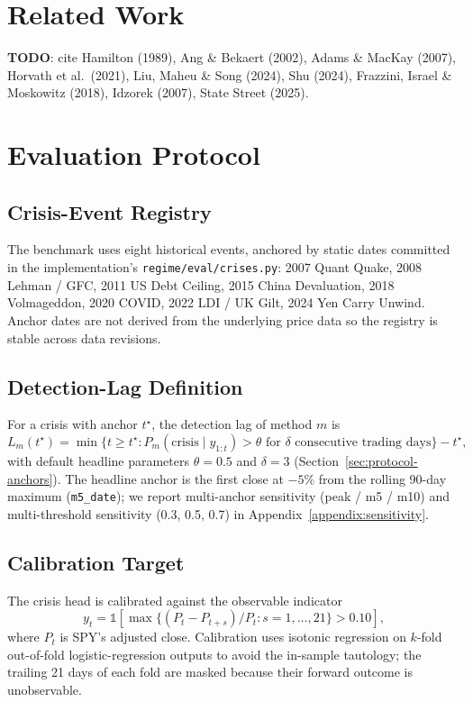 \documentclass[11pt]{article}
\begin{document}
\section{Related Work}
\label{sec:related}

\textbf{TODO}: cite Hamilton (1989), Ang \& Bekaert (2002), Adams \& MacKay
(2007), Horvath et al.\ (2021), Liu, Maheu \& Song (2024), Shu (2024),
Frazzini, Israel \& Moskowitz (2018), Idzorek (2007), State Street (2025).

\section{Evaluation Protocol}
\label{sec:protocol}

\subsection{Crisis-Event Registry}
The benchmark uses eight historical events, anchored by static dates committed
in the implementation's \texttt{regime/eval/crises.py}: 2007 Quant Quake,
2008 Lehman / GFC, 2011 US Debt Ceiling, 2015 China Devaluation, 2018
Volmageddon, 2020 COVID, 2022 LDI / UK Gilt, 2024 Yen Carry Unwind. Anchor
dates are not derived from the underlying price data so the registry is
stable across data revisions.

\subsection{Detection-Lag Definition}
For a crisis with anchor $t^\star$, the detection lag of method $m$ is
\[
  L_m(t^\star) = \min \{t \geq t^\star : P_m(\text{crisis}\mid y_{1:t}) > \theta
                       \text{ for } \delta \text{ consecutive trading days}\} - t^\star,
\]
with default headline parameters $\theta = 0.5$ and $\delta = 3$
(Section~\ref{sec:protocol-anchors}). The headline anchor is the first close
at $-5\%$ from the rolling 90-day maximum (\texttt{m5\_date}); we report
multi-anchor sensitivity (peak / m5 / m10) and multi-threshold sensitivity
(0.3, 0.5, 0.7) in Appendix~\ref{appendix:sensitivity}.

\subsection{Calibration Target}
\label{sec:protocol-calibration}
The crisis head is calibrated against the observable indicator
\[
  y_t = \mathbb{1}\!\left[\max\{(P_t - P_{t+s}) / P_t : s = 1, \dots, 21\} > 0.10\right],
\]
where $P_t$ is SPY's adjusted close. Calibration uses isotonic regression on
$k$-fold out-of-fold logistic-regression outputs to avoid the in-sample
tautology; the trailing 21 days of each fold are masked because their
forward outcome is unobservable.
\end{document}

